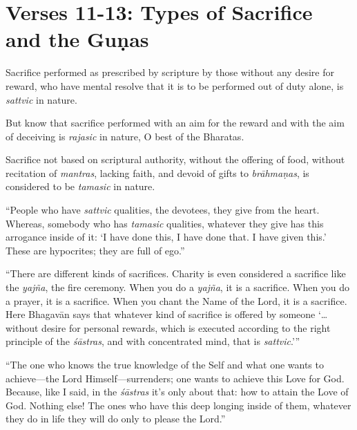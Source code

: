 \section{Verses 11-13: Types of Sacrifice and the Guṇas}\label{sec-verses-11-13-types-of-sacrifice-and-the-gunas}

{Sacrifice performed as prescribed by scripture by those without any desire for reward, who have mental resolve that it is to be performed out of duty alone, is \textit{sattvic} in nature.}


{But know that sacrifice performed with an aim for the reward and with the aim of deceiving is \textit{rajasic} in nature, O best of the Bharatas.}

{Sacrifice not based on scriptural authority, without the offering of food, without recitation of \textit{mantras}, lacking faith, and devoid of gifts to \textit{brāhmaṇas}, is considered to be \textit{tamasic} in nature.}

\enquote{People who have \textit{sattvic} qualities, the devotees, they give from the heart. Whereas, somebody who has \textit{tamasic} qualities, whatever they give has this arrogance inside of it: \enquote{I have done this, I have done that. I have given this.} These are hypocrites; they are full of ego.}

\enquote{There are different kinds of sacrifices. Charity is even considered a sacrifice like the \textit{yajña}, the fire ceremony. When you do a \textit{yajña}, it is a sacrifice. When you do a prayer, it is a sacrifice. When you chant the Name of the Lord, it is a sacrifice. Here Bhagavān says that whatever kind of sacrifice is offered by someone \enquote{\ldots without desire for personal rewards, which is executed according to the right principle of the \textit{śāstras}, and with concentrated mind, that is \textit{sattvic}.}}

\enquote{The one who knows the true knowledge of the Self and what one wants to achieve---the Lord Himself---surrenders; one wants to achieve this Love for God. Because, like I said, in the \textit{śāstras} it’s only about that: how to attain the Love of God. Nothing else! The ones who have this deep longing inside of them, whatever they do in life they will do only to please the Lord.}

